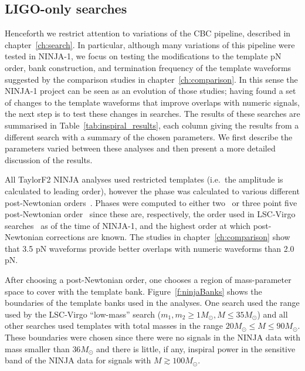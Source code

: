 \subsection{LIGO-only searches}
\label{ssec:ninja1_ligo}

Henceforth we restrict attention to variations of the CBC pipeline,
described in chapter~\ref{ch:search}.  In particular, although many
variations of this pipeline were tested in NINJA-1, we focus on
testing the modifications to the template pN order, bank construction,
and termination frequency of the template waveforms suggested by the
comparison studies in chapter~\ref{ch:comparison}.  In this sense the
NINJA-1 project can be seen as an evolution of those studies; having
found a set of changes to the template waveforms that improve overlaps
with numeric signals, the next step is to test these changes in
searches.  The results of these searches are summarised in
Table~\ref{tab:inspiral_results}, each column giving the results from
a different search with a summary of the chosen parameters.  We first
describe the parameters varied between these analyses and then present
a more detailed discussion of the results.

All TaylorF2 NINJA analyses used restricted templates (i.e.~the
amplitude is calculated to leading order), however the phase was
calculated to various different post-Newtonian
orders~\cite{Blanchet:2002av}. Phases were computed to either
two~\cite{Blanchet:1996pi,Blanchet:1995ez} or three point five
post-Newtonian
order~\cite{Blanchet:2001ax,PhysRevD.71.129902,Blanchet:2004ek} since
these are, respectively, the order used in LSC-Virgo
searches~\cite{Abbott:2009tt} as of the time of NINJA-1, and the
highest order at which post-Newtonian corrections are known.  The
studies in chapter~\ref{ch:comparison} show that 3.5 pN waveforms
provide better overlaps with numeric waveforms than 2.0 pN.

After choosing a post-Newtonian order, one chooses a region of
mass-parameter space to cover with the template bank.
Figure~\ref{f:ninjaBanks} shows the boundaries of the template banks
used in the analyses. One search used the range used by the LSC-Virgo
``low-mass'' search \cite{Abbott:2009tt} ($m_1,m_2 \ge  1 M_\odot, M
\le 35 M_{\odot}$) and all other searches used templates with total
masses in the range $20 M_\odot \le M \le 90 M_\odot$.  These
boundaries were chosen since there were no signals in the NINJA data
with mass smaller than $36 M_\odot$ and there is little, if any,
inspiral power in the sensitive band of the NINJA data for signals
with $M \gtrsim 100 M_\odot$.

